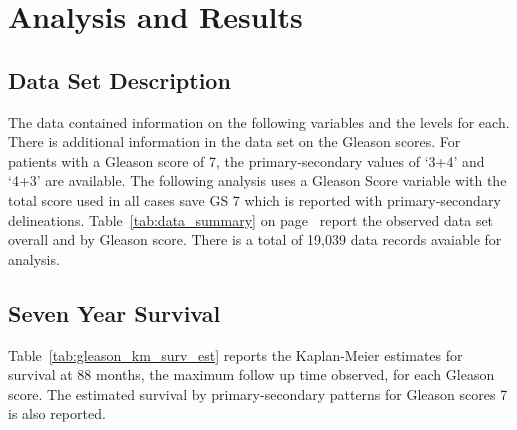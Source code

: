 % 
%
% 




\section{Analysis and Results \label{sec:analysis}}

\subsection{Data Set Description}

The data contained information on the following variables and
the levels for each.  There is additional information in the data set on the
Gleason scores.  For patients with a Gleason score of 7, the primary-secondary
values of `3+4' and `4+3' are available.  The following analysis uses a Gleason Score
variable with the total score used in all cases save GS 7 which is reported with
primary-secondary delineations.  Table~\ref{tab:data_summary} on
page~\pageref{tab:data_summary} report the observed data set overall and by
Gleason score.  There is a total of 
19,039
data records avaiable for analysis.






\subsection{Seven Year Survival}

Table~\ref{tab:gleason_km_surv_est} reports the Kaplan-Meier estimates for
survival at 88 months, the maximum follow up time observed, for each Gleason score.  
The estimated survival by primary-secondary patterns for 
Gleason scores 7 is also reported.  








